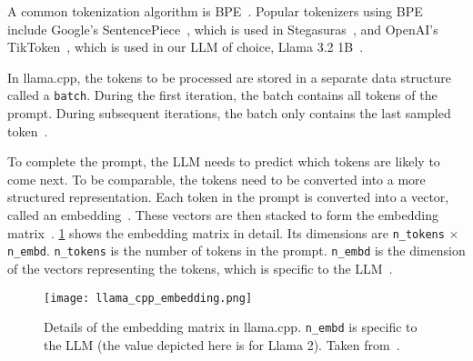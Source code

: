 A common tokenization algorithm is \gls{BPE}~\cite{sennrichNeuralMachineTranslation2016}. Popular tokenizers using \gls{BPE} include Google's SentencePiece~\cite{googleGoogleSentencepiece2024}, which is used in Stegasuras~\cite{zieglerHarvardnlpNeuralSteganography2025,zieglerStegasuras2025}, and OpenAI's TikToken~\cite{openaiOpenaiTiktoken2025}, which is used in our \gls{LLM} of choice, Llama 3.2 1B~\cite{metaMetallamaLlamamodels2025}.

In llama.cpp, the tokens to be processed are stored in a separate data structure called a \lstinline|batch|. During the first iteration, the batch contains all tokens of the prompt. During subsequent iterations, the batch only contains the last sampled token~\cite{gerganovGgerganovLlamacpp2024}.

To complete the prompt, the \gls{LLM} needs to predict which tokens are likely to come next. To be comparable, the tokens need to be converted into a more structured representation. Each token in the prompt is converted into a vector, called an embedding~\cite{mallisUnderstandingHowLLM2023}. These vectors are then stacked to form the embedding matrix~\cite{mallisUnderstandingHowLLM2023}. \cref{fig:llamaCppEmbedding} shows the embedding matrix in detail. Its dimensions are \lstinline|n_tokens| $\times$ \lstinline|n_embd|. \lstinline|n_tokens| is the number of tokens in the prompt. \lstinline|n_embd| is the dimension of the vectors representing the tokens, which is specific to the \gls{LLM}~\cite{mallisUnderstandingHowLLM2023}.

\begin{figure}
    \centering
    \captionsetup{width=\linewidth}
    \texttt{[image: llama\_cpp\_embedding.png]}
    \caption[llama.cpp: Embedding matrix]{Details of the embedding matrix in llama.cpp. \lstinline|n_embd| is specific to the \gls{LLM} (the value depicted here is for Llama 2). Taken from~\cite{mallisUnderstandingHowLLM2023}.}
    \label{fig:llamaCppEmbedding}
\end{figure}

